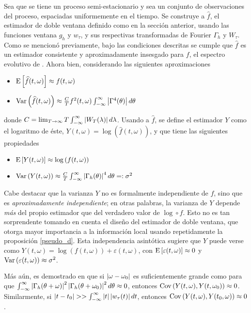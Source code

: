 Sea \xt que se tiene un proceso semi-estacionario y sea \xtd un conjunto de observaciones
del proceso, espaciadas uniformemente en el tiempo.
Se construye a $\widehat{f}$, el estimador de doble ventana definido como en la sección anterior,
usando las funciones ventana $g_h$ y $w_\tau$, y sus respectivas transformadas de Fourier
$\Gamma_h$ y $W_\tau$. Como se mencionó previamente, bajo las condiciones descritas se cumple
que $\widehat{f}$ es un estimador consistente y aproximadamente insesgado para $f$, el espectro
evolutivo de \xt. Ahora bien, considerando las siguientes aproximaciones
%
\begin{itemize}
\item $\mathrm{E}\left[ \widehat{f}(t,\omega) \right] \approx f(t,\omega)$
\item $\mathrm{Var}\left( \widehat{f}(t,\omega) \right) \approx 
\frac{C}{T} f^{2}(t,\omega) \int_{-\infty}^{\infty} \left| \Gamma^{4}(\theta) \right| d\theta$
\end{itemize}
%
donde $C = \lim_{T\rightarrow \infty} T \int_{-\infty}^{\infty} \left| W_T(\lambda) \right| d\lambda$.
Usando a $\widehat{f}$,
se define el estimador $Y$ como el logaritmo de éste, 
$Y(t,\omega) = \log\left(\widehat{f}(t,\omega)\right)$,
y que tiene las siguientes propiedades
%
\begin{itemize}
\item $\mathrm{E}\left[ Y(t,\omega) \right] \approx \log\left(f(t,\omega)\right)$
\item $\mathrm{Var}\left( Y(t,\omega) \right) \approx 
\frac{C}{T} \int_{-\infty}^{\infty} \left| \Gamma_h(\theta) \right|^{4} d\theta =: \sigma^{2}$
\end{itemize}
%

Cabe destacar que la varianza $Y$ no es formalmente independiente de $f$, sino que es
\textit{aproximadamente independiente}; en otras palabras, la varianza de $Y$ depende 
\textit{más} del propio estimador que del verdadero valor de $\log\circ f$.
Esto no es tan sorprendente tomando en cuenta el diseño del estimador de doble ventana, que
otorga mayor importancia a la información local usando repetidamente la proposición
\ref{pseudo_d}. Esta independencia asintótica sugiere que $Y$ puede verse como
%
$Y(t,\omega) = \log\left(f(t,\omega) \right) + \varepsilon(t,\omega)$,
%
con $\mathrm{E}\left[ \varepsilon(t,\omega) \right] \approx 0$ y $\mathrm{Var}\left( \varepsilon(t,\omega) \right) \approx
\sigma^{2}$.

Más aún,
es demostrado en \cite{Priestley66} que si
$\left| \omega-\omega_0 \right|$ es suficientemente grande como para que
$\int_{-\infty}^{\infty} \left| \Gamma_h(\theta+\omega) \right|^{2}\left| \Gamma_h(\theta+\omega_0) \right|^{2} d\theta \approx 0$,
entonces 
%
$\mathrm{Cov}\left( Y(t,\omega),Y(t,\omega_0) \right) \approx 0$.
%
Similarmente, si $\left| t-t_0 \right| >> \int_{-\infty}^{\infty} \left| t \right| \left| w_\tau (t) \right| dt $, entonces
%
$\mathrm{Cov}\left( Y(t,\omega),Y(t_0,\omega) \right) \approx 0$.

